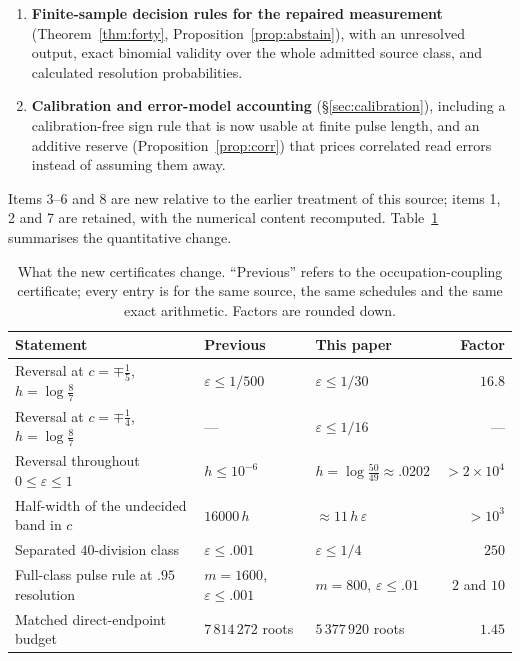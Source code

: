 \documentclass[11pt]{article}
\theoremstyle{plain}
\theoremstyle{definition}
\theoremstyle{remark}
\newcommand{\eps}{\varepsilon}
\begin{document}
\begin{enumerate}[nosep,leftmargin=*]
      pulse length, every $\eps$ and every $c$, the preferred order is
      determined outside an explicit band of half-width proportional to $\eps$
      and, for small $h$, to about $11h$. The previously available statement of
      this shape had half-width $16000\,h$ and applied only at $\eps\le1$.
\item \textbf{Finite-sample decision rules for the repaired measurement}
      (Theorem~\ref{thm:forty}, Proposition~\ref{prop:abstain}), with an
      unresolved output, exact binomial validity over the whole admitted source
      class, and calculated resolution probabilities.
\item \textbf{Calibration and error-model accounting}
      (\S\ref{sec:calibration}), including a calibration-free sign rule that is
      now usable at finite pulse length, and an additive reserve
      (Proposition~\ref{prop:corr}) that prices correlated read errors instead
      of assuming them away.
\end{enumerate}

Items 3--6 and 8 are new relative to the earlier treatment of this source;
items 1, 2 and 7 are retained, with the numerical content recomputed.
Table~\ref{tab:improve} summarises the quantitative change.

\begin{table}[tb]
\centering\small
\caption{What the new certificates change. ``Previous'' refers to the
occupation-coupling certificate; every entry is for the same source, the same
schedules and the same exact arithmetic. Factors are rounded down.}
\label{tab:improve}
\begin{tabularx}{\linewidth}{@{}Xllr@{}}
\toprule
Statement & Previous & This paper & Factor\\\midrule
Reversal at $c=\mp\tfrac15$, $h=\log\frac87$ & $\eps\le1/500$ & $\eps\le1/30$ & $16.8$\\
Reversal at $c=\mp\tfrac14$, $h=\log\frac87$ & --- & $\eps\le1/16$ & ---\\
Reversal throughout $0\le\eps\le1$ & $h\le10^{-6}$ & $h=\log\frac{50}{49}\approx.0202$ & $>2\times10^4$\\
Half-width of the undecided band in $c$ & $16000\,h$ & $\approx11\,h\,\eps$ & $>10^3$\\
Separated $40$-division class & $\eps\le.001$ & $\eps\le1/4$ & $250$\\
Full-class pulse rule at $.95$ resolution & $m=1600$, $\eps\le.001$ & $m=800$, $\eps\le.01$ & $2$ and $10$\\
Matched direct-endpoint budget & $7\,814\,272$ roots & $5\,377\,920$ roots & $1.45$\\
\bottomrule
\end{tabularx}
\end{table}
\end{document}

